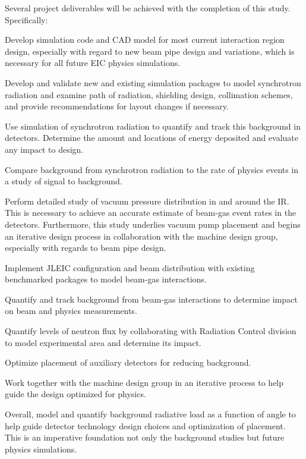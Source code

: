 Several project deliverables will be achieved with the completion of this study.  Specifically:
\begin{itemize}[label=\textbullet]
	
		\litem{} Develop simulation code and CAD model for most current interaction region design, especially with regard to new beam pipe design and variations, which is necessary for all future EIC physics simulations. 
	
		\litem{}Develop and validate new and existing simulation packages to model synchrotron radiation and examine path of radiation, shielding design, collimation schemes, and provide recommendations for layout changes if necessary. 
		
		\litem{} Use simulation of synchrotron radiation to quantify and track this background in detectors.  Determine the amount and locations of energy deposited and evaluate any impact to  design.
		
		\litem{} Compare background from synchrotron radiation to the rate of physics events in a study of signal to background. 
		
		\litem{} Perform detailed study of vacuum pressure distribution in and around the IR.  This is necessary to achieve an accurate estimate of beam-gas event rates in the detectors.  Furthermore, this study underlies vacuum pump placement and begins an iterative design process in collaboration with the machine design group, especially with regards to beam pipe design.
		
		\litem{} Implement JLEIC configuration and beam distribution with existing benchmarked packages to model beam-gas interactions.
		
		\litem{} Quantify and track background from beam-gas interactions to determine impact on beam and physics measurements.
		
		\litem{} Quantify levels of neutron flux by collaborating with Radiation Control division to model experimental area and determine its impact. 
		
		\litem{} Optimize placement of auxiliary detectors for reducing background.
					
		\litem{} Work together with the machine design group in an iterative process to help guide the design optimized for physics.
		
		\litem{} Overall, model and quantify background radiative load as a function of angle to help guide detector technology design choices and optimization of placement.  This is an imperative foundation not only the background studies but future physics simulations.  
	
	\end{itemize}